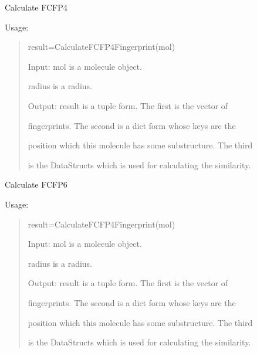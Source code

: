 \documentclass[letterpaper,10pt,english]{sphinxmanual}
\begin{document}
\begin{fulllineitems}
\label{reference/fingerprint:fingerprint.CalculateFCFP4Fingerprint}
Calculate FCFP4

Usage:
\begin{quote}

result=CalculateFCFP4Fingerprint(mol)

Input: mol is a molecule object.

radius is a radius.

Output: result is a tuple form. The first is the vector of

fingerprints. The second is a dict form whose keys are the

position which this molecule has some substructure. The third

is the DataStructs which is used for calculating the similarity.
\end{quote}

\end{fulllineitems}


\begin{fulllineitems}
\label{reference/fingerprint:fingerprint.CalculateFCFP6Fingerprint}
Calculate FCFP6

Usage:
\begin{quote}

result=CalculateFCFP4Fingerprint(mol)

Input: mol is a molecule object.

radius is a radius.

Output: result is a tuple form. The first is the vector of

fingerprints. The second is a dict form whose keys are the

position which this molecule has some substructure. The third

is the DataStructs which is used for calculating the similarity.
\end{quote}

\end{fulllineitems}

\end{document}
